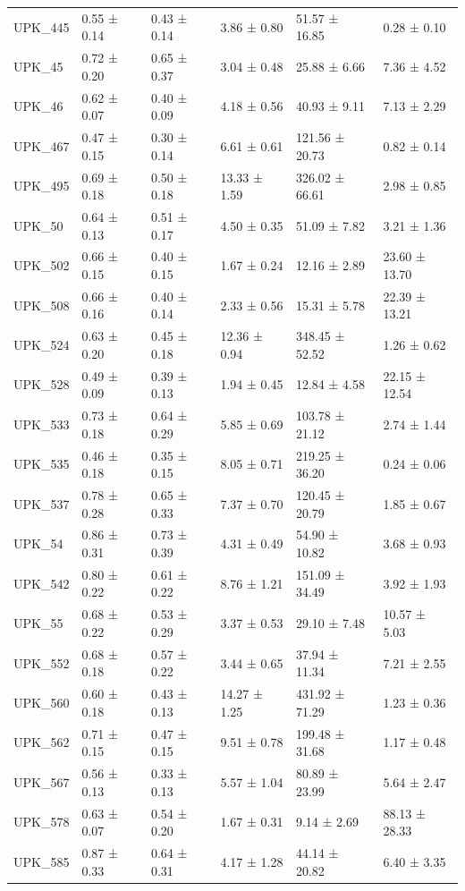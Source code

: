 \begin{tabular}{llllll}
UPK_445 & 0.55 ± 0.14 & 0.43 ± 0.14 & 3.86 ± 0.80 & 51.57 ± 16.85 & 0.28 ± 0.10 \\
UPK_45 & 0.72 ± 0.20 & 0.65 ± 0.37 & 3.04 ± 0.48 & 25.88 ± 6.66 & 7.36 ± 4.52 \\
UPK_46 & 0.62 ± 0.07 & 0.40 ± 0.09 & 4.18 ± 0.56 & 40.93 ± 9.11 & 7.13 ± 2.29 \\
UPK_467 & 0.47 ± 0.15 & 0.30 ± 0.14 & 6.61 ± 0.61 & 121.56 ± 20.73 & 0.82 ± 0.14 \\
UPK_495 & 0.69 ± 0.18 & 0.50 ± 0.18 & 13.33 ± 1.59 & 326.02 ± 66.61 & 2.98 ± 0.85 \\
UPK_50 & 0.64 ± 0.13 & 0.51 ± 0.17 & 4.50 ± 0.35 & 51.09 ± 7.82 & 3.21 ± 1.36 \\
UPK_502 & 0.66 ± 0.15 & 0.40 ± 0.15 & 1.67 ± 0.24 & 12.16 ± 2.89 & 23.60 ± 13.70 \\
UPK_508 & 0.66 ± 0.16 & 0.40 ± 0.14 & 2.33 ± 0.56 & 15.31 ± 5.78 & 22.39 ± 13.21 \\
UPK_524 & 0.63 ± 0.20 & 0.45 ± 0.18 & 12.36 ± 0.94 & 348.45 ± 52.52 & 1.26 ± 0.62 \\
UPK_528 & 0.49 ± 0.09 & 0.39 ± 0.13 & 1.94 ± 0.45 & 12.84 ± 4.58 & 22.15 ± 12.54 \\
UPK_533 & 0.73 ± 0.18 & 0.64 ± 0.29 & 5.85 ± 0.69 & 103.78 ± 21.12 & 2.74 ± 1.44 \\
UPK_535 & 0.46 ± 0.18 & 0.35 ± 0.15 & 8.05 ± 0.71 & 219.25 ± 36.20 & 0.24 ± 0.06 \\
UPK_537 & 0.78 ± 0.28 & 0.65 ± 0.33 & 7.37 ± 0.70 & 120.45 ± 20.79 & 1.85 ± 0.67 \\
UPK_54 & 0.86 ± 0.31 & 0.73 ± 0.39 & 4.31 ± 0.49 & 54.90 ± 10.82 & 3.68 ± 0.93 \\
UPK_542 & 0.80 ± 0.22 & 0.61 ± 0.22 & 8.76 ± 1.21 & 151.09 ± 34.49 & 3.92 ± 1.93 \\
UPK_55 & 0.68 ± 0.22 & 0.53 ± 0.29 & 3.37 ± 0.53 & 29.10 ± 7.48 & 10.57 ± 5.03 \\
UPK_552 & 0.68 ± 0.18 & 0.57 ± 0.22 & 3.44 ± 0.65 & 37.94 ± 11.34 & 7.21 ± 2.55 \\
UPK_560 & 0.60 ± 0.18 & 0.43 ± 0.13 & 14.27 ± 1.25 & 431.92 ± 71.29 & 1.23 ± 0.36 \\
UPK_562 & 0.71 ± 0.15 & 0.47 ± 0.15 & 9.51 ± 0.78 & 199.48 ± 31.68 & 1.17 ± 0.48 \\
UPK_567 & 0.56 ± 0.13 & 0.33 ± 0.13 & 5.57 ± 1.04 & 80.89 ± 23.99 & 5.64 ± 2.47 \\
UPK_578 & 0.63 ± 0.07 & 0.54 ± 0.20 & 1.67 ± 0.31 & 9.14 ± 2.69 & 88.13 ± 28.33 \\
UPK_585 & 0.87 ± 0.33 & 0.64 ± 0.31 & 4.17 ± 1.28 & 44.14 ± 20.82 & 6.40 ± 3.35 \\

\end{tabular}
